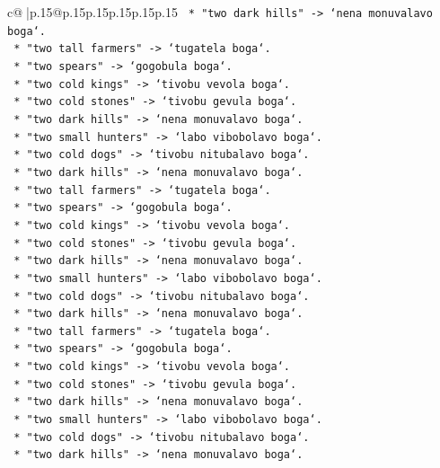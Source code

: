 \documentclass{article}
\begin{document}
{\begin{supertabular}{c@{$\;$}|p{.15\linewidth}@{}p{.15\linewidth}p{.15\linewidth}p{.15\linewidth}p{.15\linewidth}p{.15\linewidth}}
{{{\texttt{        *   "two dark hills" {-}> `nena monuvalavo boga`.} \\
\texttt{        *   "two tall farmers" {-}> `tugatela boga`.} \\
\texttt{        *   "two spears" {-}> `gogobula boga`.} \\
\texttt{        *   "two cold kings" {-}> `tivobu vevola boga`.} \\
\texttt{        *   "two cold stones" {-}> `tivobu gevula boga`.} \\
\texttt{        *   "two dark hills" {-}> `nena monuvalavo boga`.} \\
\texttt{        *   "two small hunters" {-}> `labo vibobolavo boga`.} \\
\texttt{        *   "two cold dogs" {-}> `tivobu nitubalavo boga`.} \\
\texttt{        *   "two dark hills" {-}> `nena monuvalavo boga`.} \\
\texttt{        *   "two tall farmers" {-}> `tugatela boga`.} \\
\texttt{        *   "two spears" {-}> `gogobula boga`.} \\
\texttt{        *   "two cold kings" {-}> `tivobu vevola boga`.} \\
\texttt{        *   "two cold stones" {-}> `tivobu gevula boga`.} \\
\texttt{        *   "two dark hills" {-}> `nena monuvalavo boga`.} \\
\texttt{        *   "two small hunters" {-}> `labo vibobolavo boga`.} \\
\texttt{        *   "two cold dogs" {-}> `tivobu nitubalavo boga`.} \\
\texttt{        *   "two dark hills" {-}> `nena monuvalavo boga`.} \\
\texttt{        *   "two tall farmers" {-}> `tugatela boga`.} \\
\texttt{        *   "two spears" {-}> `gogobula boga`.} \\
\texttt{        *   "two cold kings" {-}> `tivobu vevola boga`.} \\
\texttt{        *   "two cold stones" {-}> `tivobu gevula boga`.} \\
\texttt{        *   "two dark hills" {-}> `nena monuvalavo boga`.} \\
\texttt{        *   "two small hunters" {-}> `labo vibobolavo boga`.} \\
\texttt{        *   "two cold dogs" {-}> `tivobu nitubalavo boga`.} \\
\texttt{        *   "two dark hills" {-}> `nena monuvalavo boga`.} \\
}}}
\end{supertabular}}
\end{document}

